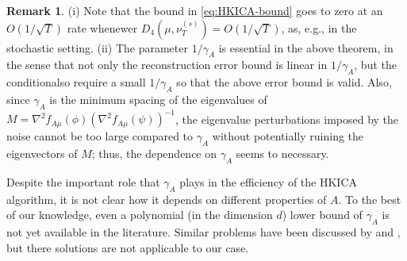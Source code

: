 \documentclass{article}
\theoremstyle{definition}
\newtheorem{remark}[lemma]{Remark}
\newcommand{\eps}{\epsilon}
\begin{document}
\fi
\begin{remark}
(i) Note that the bound in \eqref{eq:HKICA-bound} goes to zero at an $O(1/\sqrt{T})$ rate whenewer $D_4(\mu,\nu_T^{(s)})=O(1/\sqrt{T})$, as, e.g., in the stochastic setting.
(ii) The parameter $1/\gamma_A$ is essential in the above theorem, in the sense that not only the reconstruction error bound is linear in $1/\gamma_A$, but the conditionalso require a small $1/\gamma_A$ so that the above error bound is valid. Also, since $\gamma_A$ is the minimum spacing of the eigenvalues of $M=\nabla^2 f_{A\mu}(\phi) (\nabla^2 f_{A\mu}(\psi))^{-1}$, the eigenvalue perturbations imposed by the noise cannot be too large compared to $\gamma_A$ without potentially  ruining the eigenvectors of $M$; thus, the dependence on $\gamma_A$ seems to necessary.

\end{remark}

Despite the important role that $\gamma_A$ plays in the efficiency of the HKICA algorithm, it is not clear how it depends on different properties of $A$.
To the best of our knowledge, even a polynomial (in the dimension $d$) lower bound of $\gamma_A$ is not yet available in the literature. 
Similar problems have been discussed by  \citet{husler1987minimal} and \citet{goyal2014fourier}, but there solutions are not applicable to our case.
\end{document}

